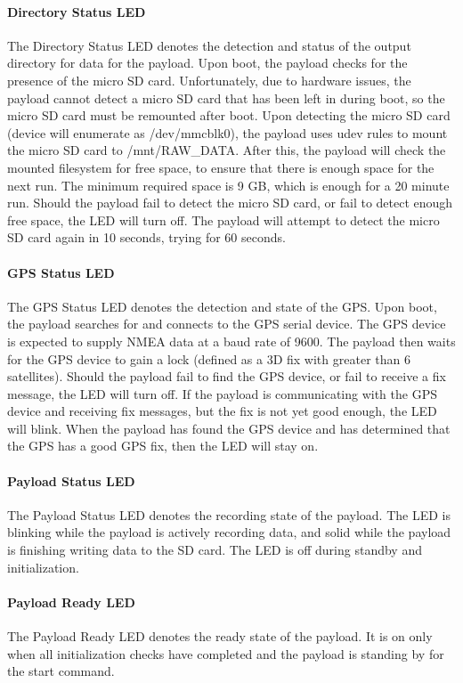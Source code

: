 \documentclass{report}
\begin{document}
					\paragraph{Directory Status LED}
						The Directory Status LED denotes the detection and status of the output directory for data for the payload.  Upon boot, the payload checks for the presence of the micro SD card.  Unfortunately, due to hardware issues, the payload cannot detect a micro SD card that has been left in during boot, so the micro SD card must be remounted after boot.  Upon detecting the micro SD card (device will enumerate as /dev/mmcblk0), the payload uses udev rules to mount the micro SD card to /mnt/RAW\_DATA.  After this, the payload will check the mounted filesystem for free space, to ensure that there is enough space for the next run.  The minimum required space is 9 GB, which is enough for a 20 minute run.  Should the payload fail to detect the micro SD card, or fail to detect enough free space, the LED will turn off.  The payload will attempt to detect the micro SD card again in 10 seconds, trying for 60 seconds.
					\paragraph{GPS Status LED}
						The GPS Status LED denotes the detection and state of the GPS.  Upon boot, the payload searches for and connects to the GPS serial device.  The GPS device is expected to supply NMEA data at a baud rate of 9600.  The payload then waits for the GPS device to gain a lock (defined as a 3D fix with greater than 6 satellites).  Should the payload fail to find the GPS device, or fail to receive a fix message, the LED will turn off.  If the payload is communicating with the GPS device and receiving fix messages, but the fix is not yet good enough, the LED will blink.  When the payload has found the GPS device and has determined that the GPS has a good GPS fix, then the LED will stay on.
					\paragraph{Payload Status LED}
						The Payload Status LED denotes the recording state of the payload.  The LED is blinking while the payload is actively recording data, and solid while the payload is finishing writing data to the SD card.  The LED is off during standby and initialization.
					\paragraph{Payload Ready LED}
						The Payload Ready LED denotes the ready state of the payload.  It is on only when all initialization checks have completed and the payload is standing by for the start command.
\end{document}
